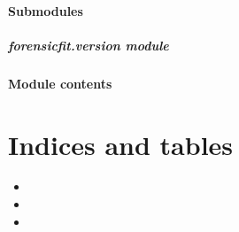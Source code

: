 \documentclass[letterpaper,10pt,english]{sphinxmanual}
\begin{document}
\subsubsection{Submodules}
\label{\detokenize{forensicfit:submodules}}
\sphinxstepscope


\paragraph{forensicfit.version module}
\label{\detokenize{forensicfit.version:module-forensicfit.version}}\label{\detokenize{forensicfit.version:forensicfit-version-module}}\label{\detokenize{forensicfit.version::doc}}

\subsubsection{Module contents}
\label{\detokenize{forensicfit:module-forensicfit}}\label{\detokenize{forensicfit:module-contents}}

\begin{fulllineitems}
\label{\detokenize{forensicfit:forensicfit.has_package}}
\pysigstartsignatures
{}
\pysigstopsignatures
\end{fulllineitems}



\chapter{Indices and tables}
\label{\detokenize{index:indices-and-tables}}\begin{itemize}
\item {} 
\sphinxAtStartPar
{}

\item {} 
\sphinxAtStartPar
{}

\item {} 
\sphinxAtStartPar
{}

\end{itemize}
\end{document}
